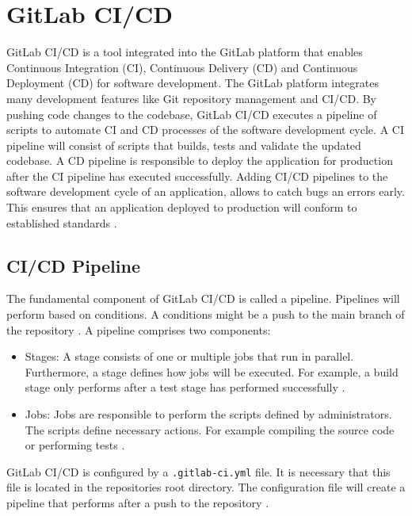 \section{GitLab CI/CD}
\label{sec:04_background_gitlab}
GitLab CI/CD is a tool integrated into the GitLab platform that enables Continuous Integration (CI), Continuous Delivery (CD) and Continuous Deployment (CD) for software development.
The GitLab platform integrates many development features like Git repository management and CI/CD.
By pushing code changes to the codebase, GitLab CI/CD executes a pipeline of scripts to automate CI and CD processes of the software development cycle.
A CI pipeline will consist of scripts that builds, tests and validate the updated codebase.
A CD pipeline is responsible to deploy the application for production after the CI pipeline has executed successfully.
Adding CI/CD pipelines to the software development cycle of an application, allows to catch bugs an errors early. This ensures that an application deployed to production will conform to established standards \cite{Gitlab2020Docs}.

\subsection{CI/CD Pipeline}

The fundamental component of GitLab CI/CD is called a pipeline. Pipelines will perform based on conditions. A conditions might be a push to the main branch of the repository \cite{Gitlab2020Docs}. A pipeline comprises two components:

\begin{itemize}
\item Stages: A stage consists of one or multiple jobs that run in parallel. Furthermore, a stage defines how jobs will be executed. For example, a build stage only performs after a test stage has performed successfully \cite{Gitlab2020Docs}.

\item Jobs: Jobs are responsible to perform the scripts defined by administrators. The scripts define necessary actions. For example compiling the source code or performing tests \cite{Gitlab2020Docs}.
\end{itemize}


GitLab CI/CD is configured by a \texttt{.gitlab-ci.yml} file. It is necessary that this file is located in the repositories root directory.
The configuration file will create a pipeline that performs after a push to the repository \cite{Gitlab2020Docs}.


